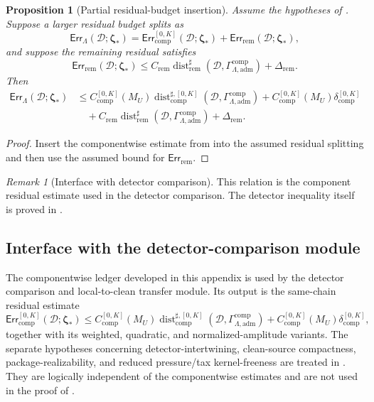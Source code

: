 \documentclass[11pt]{article}
\numberwithin{equation}{section}
\newtheorem{proposition}[proposition]{Proposition}
\theoremstyle{definition}
\theoremstyle{remark}
\newtheorem{remark}[remark]{Remark}
\newcommand{\adm}{\mathrm{adm}}
\newcommand{\comp}{\mathrm{comp}}
\newcommand{\Err}{\mathsf{Err}}
\newcommand{\Dist}{\operatorname{dist}}
\newcommand{\calD}{\mathcal D}
\newcommand{\bzeta}{\boldsymbol\zeta}
\newcommand{\Gcomp}{\Gamma_{\Lambda,\adm}^{\comp}}
\begin{document}
\begin{proposition}[Partial residual-budget insertion]
\label{comp:prop:partial-residual-budget}
Assume the hypotheses of .  Suppose a
larger residual budget splits as
\[
    \Err_{\Lambda}(\calD;\bzeta_*)
    =
    \Err_{\comp}^{[0,K]}(\calD;\bzeta_*)
    +
    \Err_{\mathrm{rem}}(\calD;\bzeta_*),
\]
and suppose the remaining residual satisfies
\[
    \Err_{\mathrm{rem}}(\calD;\bzeta_*)
    \le
    C_{\mathrm{rem}}
    \Dist_{\mathrm{rem}}^{\sharp}(\calD,\Gcomp)
    +
    \Delta_{\mathrm{rem}}.
\]
Then
\[
\begin{aligned}
    \Err_{\Lambda}(\calD;\bzeta_*)
    &\le
    C_{\comp}^{[0,K]}(M_U)
    \Dist_{\comp}^{\sharp,[0,K]}(\calD,\Gcomp)
    +
    C_{\comp}^{[0,K]}(M_U)\delta_{\comp}^{[0,K]}\\
    &\quad+
    C_{\mathrm{rem}}
    \Dist_{\mathrm{rem}}^{\sharp}(\calD,\Gcomp)
    +
    \Delta_{\mathrm{rem}}.
\end{aligned}
\]
\end{proposition}

\begin{proof}
Insert the componentwise estimate from
 into the assumed residual splitting and
then use the assumed bound for \(\Err_{\mathrm{rem}}\).
\end{proof}

\begin{remark}[Interface with detector comparison]
This relation is the component residual estimate used in the detector
comparison.  The detector inequality itself is proved in
.
\end{remark}


\subsection{Interface with the detector-comparison module}
\label{comp:sec:interface-detector}

The componentwise ledger developed in this appendix is used by the detector
comparison and local-to-clean transfer module.  Its output is the same-chain
residual estimate
\[
    \Err_{\comp}^{[0,K]}(\calD;\bzeta_*)
    \le
    C_{\comp}^{[0,K]}(M_U)
    \Dist_{\comp}^{\sharp,[0,K]}(\calD,\Gcomp)
    +
    C_{\comp}^{[0,K]}(M_U)\delta_{\comp}^{[0,K]},
\]
together with its weighted, quadratic, and normalized-amplitude variants.  The
separate hypotheses concerning detector-intertwining, clean-source compactness,
package-realizability, and reduced pressure/tax kernel-freeness are treated in
.  They are logically independent of the
componentwise estimates and are not used in the proof of
.
\end{document}
